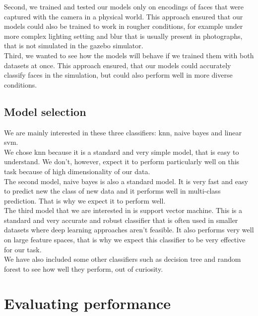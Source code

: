 \documentclass[12pt,a4paper]{article}
\begin{document}
    Second, we trained and tested our models only on encodings of faces that were captured with the camera in a physical world. This approach ensured that our models could also be trained to work in rougher conditions, for example under more complex lighting setting and blur that is usually present in photographs, that is not simulated in the gazebo simulator. \\

    Third, we wanted to see how the models will behave if we trained them with both datasets at once. This approach ensured, that our models could accurately classify faces in the simulation, but could also perform well in more diverse conditions. \\

    \subsection{Model selection}

    We are mainly interested in these three classifiers: knn, naive bayes and linear svm. \\

    We chose knn because it is a standard and very simple model, that is easy to understand. We don't, however, expect it to perform particularly well on this task because of high dimensionality of our data. \\

    The second model, naive bayes is also a standard model. It is very fast and easy to predict new the class of new data and it performs well in multi-class prediction. That is why we expect it to perform well. \\

    The third model that we are interested in is support vector machine. This is a standard and very accurate and robust classifier that is often used in smaller datasets where deep learning approaches aren't feasible. It also performs very well on large feature spaces, that is why we expect this classifier to be very effective for our task. \\

    We have also included some other classifiers such as decision tree and random forest to see how well they perform, out of curiosity. 

    \section{Evaluating performance}
\end{document}
